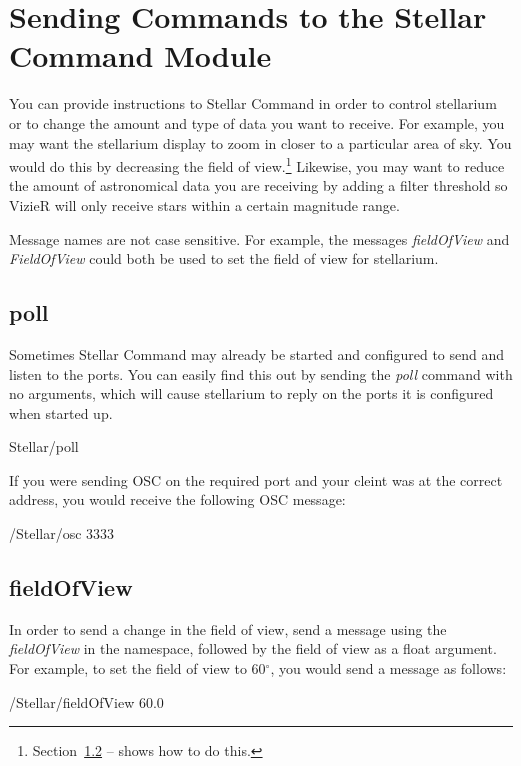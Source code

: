 \section{Sending Commands to the Stellar Command Module}
You can provide instructions to Stellar Command in order to control stellarium or to change the amount and type of data you want to receive. For example, you may want the stellarium display to zoom in closer to a particular area of sky. You would do this by decreasing the field of view.\footnote{Section~\ref{subsec:fieldofview} --
	\emph{} shows how to do this.} Likewise, you may want to reduce the amount of astronomical data you are receiving by adding a filter threshold so VizieR will only receive stars within a certain magnitude range. 

Message names are not case sensitive. For example, the messages \textit{fieldOfView} and \textit{FieldOfView} could both be used to set the field of view for stellarium.

\subsection{poll}  \label{sec:poll} 
Sometimes Stellar Command may already be started and configured to send and listen to the ports. You can easily find this out by sending the \textit{poll} command with no arguments, which will cause stellarium to reply on the ports it is configured when started up.

 \begin{syntax}
	\medskip
	Stellar/poll
	\medskip
\end{syntax}

If you were sending OSC on the required port and your cleint was at the correct address, you would receive the following OSC message:
\begin{syntax}
	/Stellar/osc 3333  \\
\end{syntax}
\bigskip


\subsection{fieldOfView}\label{subsec:fieldofview} 

In order to send a change in the field of view, send a message using the \textit{fieldOfView} in the namespace, followed by the field of view as a float argument. For example, to set the field of view to 60$^{\circ}$, you would send a message as follows:
 \begin{syntax}	
 	\medskip
	/Stellar/fieldOfView 60.0
	\medskip
 \end{syntax}
\bigskip

